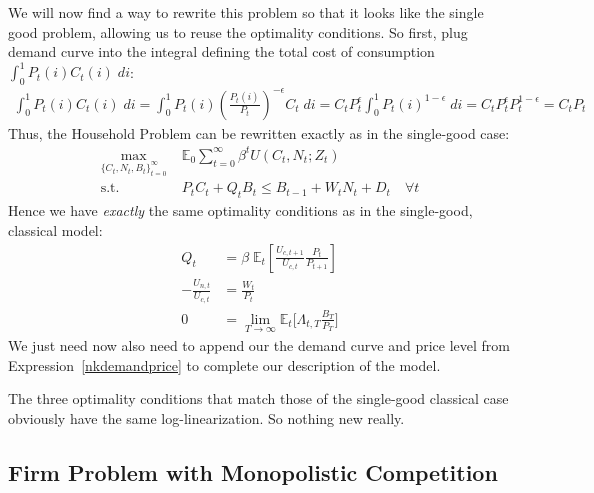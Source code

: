 \documentclass[12pt]{article}
\theoremstyle{plain}
\theoremstyle{definition}
\theoremstyle{remark}
\newcommand{\limT}{\lim_{T\rightarrow\infty}}
\newcommand{\E}{\mathbb{E}}
\newcommand{\sumtinfz}{\sum^\infty_{t=0}}
\newcommand{\tinfz}{^\infty_{t=0}}
\begin{document}
We will now find a way to rewrite this problem so that it looks like the
single good problem, allowing us to reuse the optimality conditions.
So first, plug demand curve into the integral defining the total cost of
consumption $\int_0^1 P_t(i)C_t(i)\;di$:
\begin{align*}
  \int_0^1 P_t(i)C_t(i)\; di
  =
  \int_0^1 P_t(i)
  \left( \frac{P_t(i)}{P_t} \right)^{-\epsilon}
  C_t
  \; di
  =
  C_t P_t^{\epsilon}
  \int_0^1 P_t(i)^{1-\epsilon}
  \; di
  =
  C_t P_t^{\epsilon}
  P_t^{1-\epsilon}
  = C_tP_t
\end{align*}
Thus, the Household Problem can be rewritten exactly as in the
single-good case:
\begin{align*}
  \max_{\{C_t,N_t,B_t\}\tinfz} \;
  &\E_0\sumtinfz \beta^t U(C_t,N_t;Z_t)
  \\
  \text{s.t.}\quad&
  P_tC_t + Q_{t}B_t \leq B_{t-1} + W_tN_t + D_t\quad \forall t
\end{align*}
Hence we have \emph{exactly} the same optimality conditions as
in the single-good, classical model:
\begin{align*}
  Q_t &=
  \beta\;
  \E_t\left[
    \frac{U_{c,t+1}}{U_{c,t}}
    \frac{P_t}{P_{t+1}}
  \right]
  \\
  -\frac{U_{n,t}}{U_{c,t}}
  &=
  \frac{W_t}{P_{t}} \\
  0 &=
  \limT \E_t\bigg[
    \Lambda_{t,T}
    \frac{B_T}{P_T}
  \bigg]
\end{align*}
We just need now also need to append our the demand curve and price
level from Expression~\ref{nkdemandprice} to complete our description of
the model.

The three optimality conditions that match those of the single-good
classical case obviously have the same log-linearization.
So nothing new really.


\clearpage
\subsection{Firm Problem with Monopolistic Competition}
\end{document}
